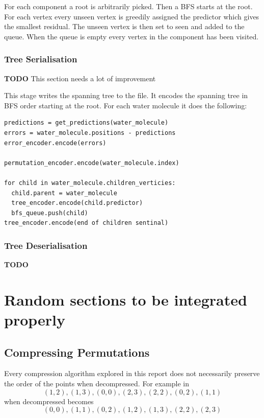 \documentclass{report}
\newcommand{\todo}{\textbf{TODO} }
\begin{document}
For each component a root is arbitrarily picked. Then a BFS starts at the
root. For each vertex every unseen vertex is greedily assigned the predictor
which gives the smallest residual. The unseen vertex is then set to seen and
added to the queue. When the queue is empty every vertex in the component has
been visited.


\subsection{Tree Serialisation}

\todo This section needs a lot of improvement

This stage writes the spanning tree to the file. It encodes the spanning tree
in BFS order starting at the root. For each water molecule it does the following:

\begin{verbatim}
predictions = get_predictions(water_molecule)
errors = water_molecule.positions - predictions
error_encoder.encode(errors)

permutation_encoder.encode(water_molecule.index)

for child in water_molecule.children_verticies:
  child.parent = water_molecule
  tree_encoder.encode(child.predictor)
  bfs_queue.push(child)
tree_encoder.encode(end of children sentinal)
\end{verbatim}


\subsection{Tree Deserialisation}

\todo

\chapter{Random sections to be integrated properly}

\section{Compressing Permutations}
\label{sec:compr-perm}

Every compression algorithm explored in this report does not necessarily
preserve the order of the points when decompressed. For example in
\citep{devillers2000gci}
\[ (1, 2), (1, 3), (0, 0), (2, 3), (2, 2), (0, 2), (1, 1) \]
when decompressed becomes
\[ (0, 0), (1, 1), (0, 2), (1, 2), (1, 3), (2, 2), (2, 3) \]
\end{document}
